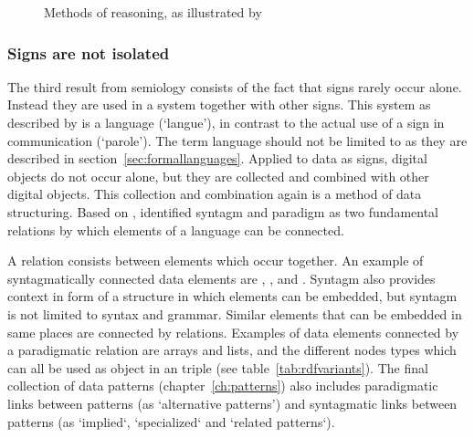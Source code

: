 \begin{figure}
\centering
{}
\caption{Methods of reasoning, as illustrated by \textcite{Eco1984}}
\label{fig:reasong}
\end{figure}

\subsubsection{Signs are not isolated}

The third result from semiology consists of the fact that signs rarely occur
alone. Instead they are used in a system together with other signs. This system
as described by  is a language (`langue'), in
contrast to the actual use of a sign in communication (`parole'). The term
language should not be limited to  as
they are described in section~\ref{sec:formallanguages}.  Applied to data as
signs, digital objects do not occur alone, but they are collected and combined
with other digital objects. This collection and combination again is a method
of data structuring. Based on ,
\textcite{Hjelmslev1953} identified syntagm and paradigm as two fundamental
relations by which elements of a language can be connected.

A  relation consists between elements which occur
together.  An example of syntagmatically connected data elements are , , and . Syntagm also provides
context in form of a structure in which elements can be embedded, but syntagm
is not limited to syntax and grammar. Similar elements that can be embedded in
same places are connected by  relations. Examples
of data elements connected by a paradigmatic relation are arrays and lists, and
the different  nodes types which can all be used as object in an
 triple (see table~\ref{tab:rdfvariants}). The final collection of
data patterns (chapter~\ref{ch:patterns}) also includes paradigmatic links
between patterns (as `alternative patterns') and syntagmatic links between
patterns (as `implied`, `specialized` and `related patterns`).

